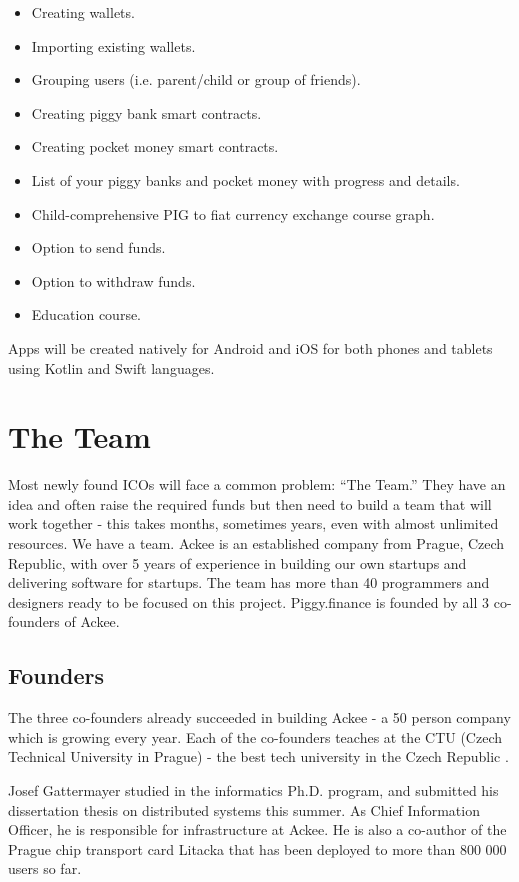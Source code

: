 \documentclass[english]{article}
\begin{document}
\begin{itemize}
  \item Creating wallets.
  \item Importing existing wallets.
   \item Grouping users (i.e. parent/child or group of friends).
   \item Creating piggy bank smart contracts.
   \item Creating pocket money smart contracts.
   \item List of your piggy banks and pocket money with progress and details.
   \item Child-comprehensive PIG to fiat currency exchange course graph.
   \item Option to send funds.
   \item Option to withdraw funds.
   \item Education course.
\end{itemize}

Apps will be created natively for Android and iOS for both phones and tablets using Kotlin and Swift languages.

\section{The Team}
Most newly found ICOs will face a common problem: “The Team.” They have an idea and often raise the required funds but then need to build a team that will work together - this takes months, sometimes years, even with almost unlimited resources. We have a team. Ackee is an established company from Prague, Czech Republic, with over 5 years of experience in building our own startups and delivering software for startups. The team has more than 40 programmers and designers ready to be focused on this project. Piggy.finance is founded by all 3 co-founders of Ackee.

\subsection{Founders}
The three co-founders already succeeded in building Ackee - a 50 person company which is growing every year. Each of the co-founders teaches at the CTU (Czech Technical University in Prague) \cite{cvutweb} - the best tech university in the Czech Republic \cite{cvut}.

Josef Gattermayer studied in the informatics Ph.D. program, and submitted his dissertation thesis on distributed systems this summer. As Chief Information Officer, he is responsible for infrastructure at Ackee. He is also a co-author of the Prague chip transport card Litacka \cite{litacka} that has been deployed to more than 800 000 users so far.
\end{document}

